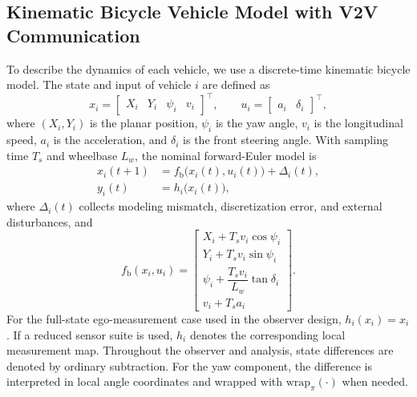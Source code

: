 \documentclass[letterpaper,journal]{IEEEtran}
\begin{document}
\subsection{Kinematic Bicycle Vehicle Model with V2V Communication}
To describe the dynamics of each vehicle, we use a discrete-time kinematic bicycle model. The state and input of vehicle $i$ are defined as
\begin{equation*}
    x_i=\begin{bmatrix}X_i&Y_i&\psi_i&v_i\end{bmatrix}^{\top},
    \qquad
    u_i=\begin{bmatrix}a_i&\delta_i\end{bmatrix}^{\top},
\end{equation*}
where $(X_i,Y_i)$ is the planar position, $\psi_i$ is the yaw angle, $v_i$ is the longitudinal speed, $a_i$ is the acceleration, and $\delta_i$ is the front steering angle. With sampling time $T_s$ and wheelbase $L_w$, the nominal forward-Euler model is
\begin{equation}\label{v_i}
    \begin{aligned}
        x_i(t+1) &= f_{\text{b}}\big(x_i(t),u_i(t)\big)+\Delta_i(t),\\
        y_i(t) &= h_i\big(x_i(t)\big),
    \end{aligned}
\end{equation}
where $\Delta_i(t)$ collects modeling mismatch, discretization error, and external disturbances, and
\begin{equation}
f_{\text{b}}(x_i,u_i)=
\begin{bmatrix}
X_i+T_s v_i\cos\psi_i\\
Y_i+T_s v_i\sin\psi_i\\
\psi_i+\dfrac{T_s v_i}{L_w}\tan\delta_i\\
v_i+T_s a_i
\end{bmatrix}.
\label{eq_bicycle_map}
\end{equation}
For the full-state ego-measurement case used in the observer design, $h_i(x_i)=x_i$. If a reduced sensor suite is used, $h_i$ denotes the corresponding local measurement map.
Throughout the observer and analysis, state differences are denoted by ordinary subtraction. For the yaw component, the difference is interpreted in local angle coordinates and wrapped with $\mathrm{wrap}_{\pi}(\cdot)$ when needed.
\end{document}
